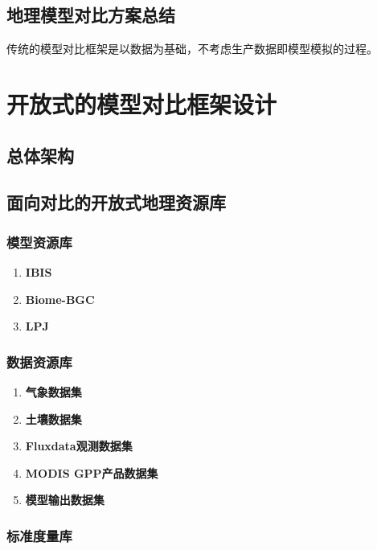 \subsection{地理模型对比方案总结}
传统的模型对比框架是以数据为基础，不考虑生产数据即模型模拟的过程。

\section{开放式的模型对比框架设计}
\subsection{总体架构}
\subsection{面向对比的开放式地理资源库}
\subsubsection{模型资源库}
\begin{enumerate}[(1)]
\item \textbf{IBIS}

\item \textbf{Biome-BGC}

\item \textbf{LPJ}

\end{enumerate}


\subsubsection{数据资源库}
\begin{enumerate}[(1)]
\item \textbf{气象数据集}

\item \textbf{土壤数据集}

\item \textbf{Fluxdata观测数据集}

\item \textbf{MODIS GPP产品数据集}

\item \textbf{模型输出数据集}

\end{enumerate}
\subsubsection{标准度量库}
